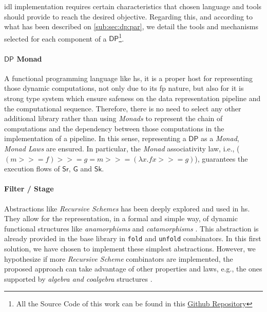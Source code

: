 \documentclass[preprint]{elsarticle}
\newcommand{\DP}{\mathsf{DP}}
\newcommand{\iwcc}{\mathsf{Sr}}
\newcommand{\owcc}{\mathsf{Sk}}
\newcommand{\gwcc}{\mathsf{G}}
\begin{document}
\acrshort{idl} implementation requires certain characteristics that chosen language and tools should provide to reach the desired objective. Regarding this, and according to what has been described on \autoref{sub:sec:dp:par}, we detail the tools and mechanisms selected for each component of a $\DP$\footnote{All the Source Code of this work can be found in this  \href{https://github.com/jproyo/upc-miri-tfm/tree/feature/library-v1/connected-comp}{Github Repository}}.

\paragraph{$\DP$ Monad\label{sub:sec:filter}} A functional programming language like \acrshort{hs}, it is a proper host for representing those dynamic computations, not only due to its \acrshort{fp} nature, but also for it is strong type system which ensure safeness on the data representation pipeline and the computational sequence. Therefore, there is no need to select any other additional library rather than using \emph{Monads} \cite{monads} to represent the chain of computations and the dependency between those computations in the implementation of a pipeline. In this sense,  representing  a $\DP$ as a \emph{Monad}, \emph{Monad Laws} \cite{monadlaws} are ensured. In particular, the \emph{Monad} associativity law, i.e.,  ($(m >>= f ) >>= g = m >>= (\lambda x.f x >>= g)$), guarantees the execution flows of $\iwcc$, $\gwcc$ and $\owcc$.

\paragraph{Filter / Stage} Abstractions like \textit{Recursive Schemes} \cite{lenses} has been deeply explored and used in \acrshort{hs}. They allow for the representation, in a formal and simple way, of dynamic functional structures like \textit{anamorphisms} and \textit{catamorphisms} \cite{lenses}. This abstraction is already provided in the base library in \texttt{fold} and \texttt{unfold} combinators. In this first solution, we have chosen to implement these simplest abstractions. However, we hypothesize if more \textit{Recursive Scheme} combinators are implemented, the proposed approach can take advantage of other properties and laws, e.g., the ones supported by \emph{algebra and coalgebra} structures \cite{lenses}. 
\end{document}
